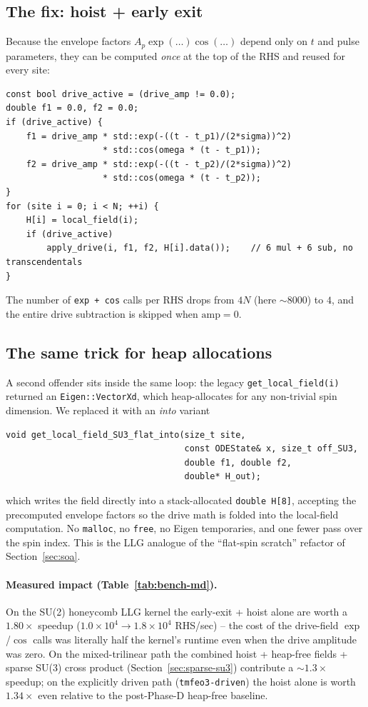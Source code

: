 \documentclass[11pt,letterpaper]{article}
\begin{document}
\subsection{The fix: hoist + early exit}
Because the envelope factors $A_p \exp(\dots) \cos(\dots)$ depend only
on $t$ and pulse parameters, they can be computed \emph{once} at the
top of the RHS and reused for every site:
\begin{lstlisting}
const bool drive_active = (drive_amp != 0.0);
double f1 = 0.0, f2 = 0.0;
if (drive_active) {
    f1 = drive_amp * std::exp(-((t - t_p1)/(2*sigma))^2)
                   * std::cos(omega * (t - t_p1));
    f2 = drive_amp * std::exp(-((t - t_p2)/(2*sigma))^2)
                   * std::cos(omega * (t - t_p2));
}
for (site i = 0; i < N; ++i) {
    H[i] = local_field(i);
    if (drive_active)
        apply_drive(i, f1, f2, H[i].data());    // 6 mul + 6 sub, no transcendentals
}
\end{lstlisting}
The number of \texttt{exp + cos} calls per RHS drops from $4N$ (here
$\sim 8000$) to $4$, and the entire drive subtraction is skipped when
$\text{amp} = 0$.

\subsection{The same trick for heap allocations}
A second offender sits inside the same loop: the legacy
\texttt{get\_local\_field(i)} returned an \texttt{Eigen::VectorXd},
which heap-allocates for any non-trivial spin dimension.  We replaced
it with an \emph{into} variant
\begin{lstlisting}
void get_local_field_SU3_flat_into(size_t site,
                                   const ODEState& x, size_t off_SU3,
                                   double f1, double f2,
                                   double* H_out);
\end{lstlisting}
which writes the field directly into a stack-allocated
\texttt{double H[8]}, accepting the precomputed envelope factors so
the drive math is folded into the local-field computation.  No
\texttt{malloc}, no \texttt{free}, no Eigen temporaries, and one
fewer pass over the spin index.  This is the LLG analogue of the
``flat-spin scratch'' refactor of Section~\ref{sec:soa}.

\paragraph{Measured impact (Table~\ref{tab:bench-md}).}
On the SU(2) honeycomb LLG kernel the early-exit + hoist alone are
worth a $1.80\times$ speedup ($1.0\times10^{4} \to 1.8\times10^{4}$
RHS/sec) -- the cost of the drive-field $\exp$/$\cos$ calls was
literally half the kernel's runtime even when the drive amplitude was
zero.  On the mixed-trilinear path the combined hoist + heap-free
fields + sparse SU(3) cross product (Section~\ref{sec:sparse-su3})
contribute a $\sim 1.3\times$ speedup; on the explicitly driven path
(\texttt{tmfeo3-driven}) the hoist alone is worth $1.34\times$ even
relative to the post-Phase-D heap-free baseline.
\end{document}
